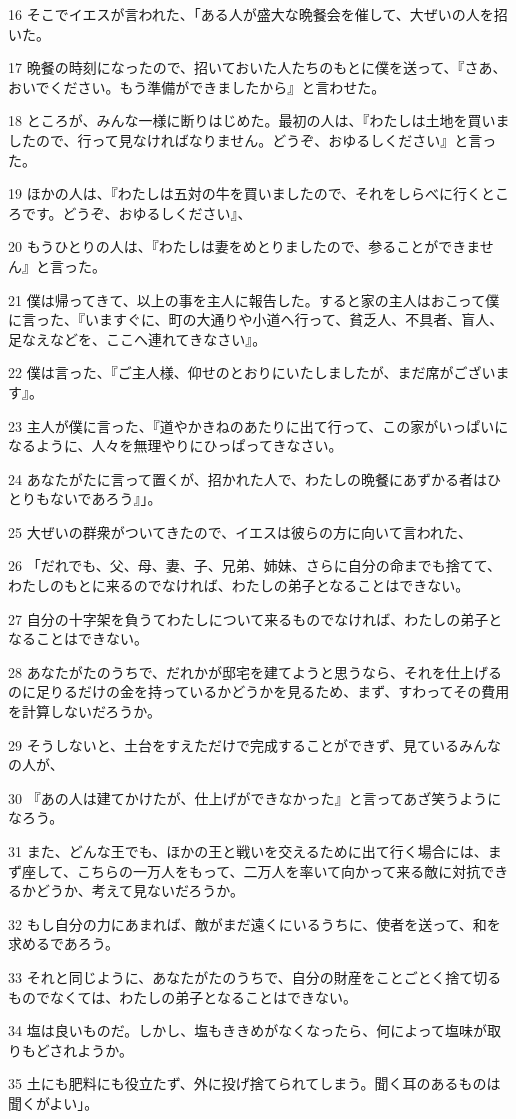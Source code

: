 \par 16 そこでイエスが言われた、「ある人が盛大な晩餐会を催して、大ぜいの人を招いた。
\par 17 晩餐の時刻になったので、招いておいた人たちのもとに僕を送って、『さあ、おいでください。もう準備ができましたから』と言わせた。
\par 18 ところが、みんな一様に断りはじめた。最初の人は、『わたしは土地を買いましたので、行って見なければなりません。どうぞ、おゆるしください』と言った。
\par 19 ほかの人は、『わたしは五対の牛を買いましたので、それをしらべに行くところです。どうぞ、おゆるしください』、
\par 20 もうひとりの人は、『わたしは妻をめとりましたので、参ることができません』と言った。
\par 21 僕は帰ってきて、以上の事を主人に報告した。すると家の主人はおこって僕に言った、『いますぐに、町の大通りや小道へ行って、貧乏人、不具者、盲人、足なえなどを、ここへ連れてきなさい』。
\par 22 僕は言った、『ご主人様、仰せのとおりにいたしましたが、まだ席がございます』。
\par 23 主人が僕に言った、『道やかきねのあたりに出て行って、この家がいっぱいになるように、人々を無理やりにひっぱってきなさい。
\par 24 あなたがたに言って置くが、招かれた人で、わたしの晩餐にあずかる者はひとりもないであろう』」。
\par 25 大ぜいの群衆がついてきたので、イエスは彼らの方に向いて言われた、
\par 26 「だれでも、父、母、妻、子、兄弟、姉妹、さらに自分の命までも捨てて、わたしのもとに来るのでなければ、わたしの弟子となることはできない。
\par 27 自分の十字架を負うてわたしについて来るものでなければ、わたしの弟子となることはできない。
\par 28 あなたがたのうちで、だれかが邸宅を建てようと思うなら、それを仕上げるのに足りるだけの金を持っているかどうかを見るため、まず、すわってその費用を計算しないだろうか。
\par 29 そうしないと、土台をすえただけで完成することができず、見ているみんなの人が、
\par 30 『あの人は建てかけたが、仕上げができなかった』と言ってあざ笑うようになろう。
\par 31 また、どんな王でも、ほかの王と戦いを交えるために出て行く場合には、まず座して、こちらの一万人をもって、二万人を率いて向かって来る敵に対抗できるかどうか、考えて見ないだろうか。
\par 32 もし自分の力にあまれば、敵がまだ遠くにいるうちに、使者を送って、和を求めるであろう。
\par 33 それと同じように、あなたがたのうちで、自分の財産をことごとく捨て切るものでなくては、わたしの弟子となることはできない。
\par 34 塩は良いものだ。しかし、塩もききめがなくなったら、何によって塩味が取りもどされようか。
\par 35 土にも肥料にも役立たず、外に投げ捨てられてしまう。聞く耳のあるものは聞くがよい」。

